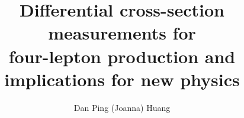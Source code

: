 \documentclass[hyperpdf,bindnopdf]{hepthesis}
\title{\Large Differential cross-section measurements
for \\ 
four-lepton production and implications for new physics}
\author{\large Dan Ping (Joanna) Huang}
\begin{document}
\begin{frontmatter}
  
%   
\end{frontmatter}

\begin{mainmatter}
  
%   
%   
%   
%   
%   
\end{mainmatter}

\begin{appendices}
      
\end{appendices}

\begin{backmatter}
  
\end{backmatter}

\end{document}
